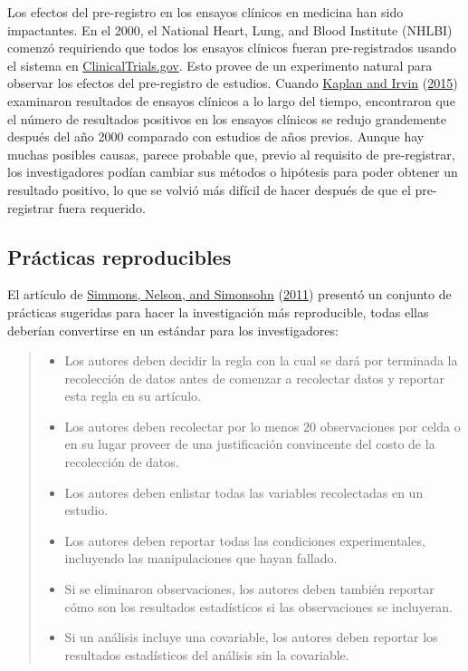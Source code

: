 \documentclass[
  12pt,
]{book}
\providecommand{\tightlist}{%
  \setlength{\itemsep}{0pt}\setlength{\parskip}{0pt}}
\begin{document}
Los efectos del pre-registro en los ensayos clínicos en medicina han sido impactantes. En el 2000, el National Heart, Lung, and Blood Institute (NHLBI) comenzó requiriendo que todos los ensayos clínicos fueran pre-registrados usando el sistema en \href{http://clinicaltrials.gov}{ClinicalTrials.gov}. Esto provee de un experimento natural para observar los efectos del pre-registro de estudios. Cuando \protect\hyperlink{ref-kapl:irvi:2015}{Kaplan and Irvin} (\protect\hyperlink{ref-kapl:irvi:2015}{2015}) examinaron resultados de ensayos clínicos a lo largo del tiempo, encontraron que el número de resultados positivos en los ensayos clínicos se redujo grandemente después del año 2000 comparado con estudios de años previos. Aunque hay muchas posibles causas, parece probable que, previo al requisito de pre-registrar, los investigadores podían cambiar sus métodos o hipótesis para poder obtener un resultado positivo, lo que se volvió más difícil de hacer después de que el pre-registrar fuera requerido.

\hypertarget{pruxe1cticas-reproducibles}{%
\subsection{Prácticas reproducibles}\label{pruxe1cticas-reproducibles}}

El artículo de \protect\hyperlink{ref-simm:nels:simo:2011}{Simmons, Nelson, and Simonsohn} (\protect\hyperlink{ref-simm:nels:simo:2011}{2011}) presentó un conjunto de prácticas sugeridas para hacer la investigación más reproducible, todas ellas deberían convertirse en un estándar para los investigadores:

\begin{quote}
\begin{itemize}
\tightlist
\item
  Los autores deben decidir la regla con la cual se dará por terminada la recolección de datos antes de comenzar a recolectar datos y reportar esta regla en su artículo.
\item
  Los autores deben recolectar por lo menos 20 observaciones por celda o en su lugar proveer de una justificación convincente del costo de la recolección de datos.
\item
  Los autores deben enlistar todas las variables recolectadas en un estudio.
\item
  Los autores deben reportar todas las condiciones experimentales, incluyendo las manipulaciones que hayan fallado.
\item
  Si se eliminaron observaciones, los autores deben también reportar cómo son los resultados estadísticos si las observaciones se incluyeran.
\item
  Si un análisis incluye una covariable, los autores deben reportar los resultados estadísticos del análisis sin la covariable.
\end{itemize}
\end{quote}
\end{document}
